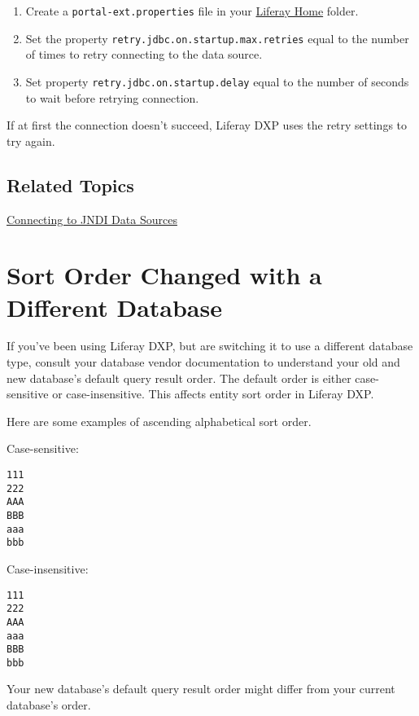 \begin{enumerate}
\def\labelenumi{\arabic{enumi}.}
\item
  Create a \texttt{portal-ext.properties} file in your
  \href{/docs/7-1/deploy/-/knowledge_base/d/liferay-home}{Liferay Home}
  folder.
\item
  Set the property \texttt{retry.jdbc.on.startup.max.retries} equal to
  the number of times to retry connecting to the data source.
\item
  Set property \texttt{retry.jdbc.on.startup.delay} equal to the number
  of seconds to wait before retrying connection.
\end{enumerate}

If at first the connection doesn't succeed, Liferay DXP uses the retry
settings to try again.

\section{Related Topics}\label{related-topics-10}

\href{/docs/7-2/appdev/-/knowledge_base/a/connecting-to-data-sources-using-jndi}{Connecting
to JNDI Data Sources}

\chapter{Sort Order Changed with a Different
Database}\label{sort-order-changed-with-a-different-database}

If you've been using Liferay DXP, but are switching it to use a
different database type, consult your database vendor documentation to
understand your old and new database's default query result order. The
default order is either case-sensitive or case-insensitive. This affects
entity sort order in Liferay DXP.

Here are some examples of ascending alphabetical sort order.

Case-sensitive:

\begin{verbatim}
111
222
AAA
BBB
aaa
bbb
\end{verbatim}

Case-insensitive:

\begin{verbatim}
111
222
AAA
aaa
BBB
bbb
\end{verbatim}

Your new database's default query result order might differ from your
current database's order.

